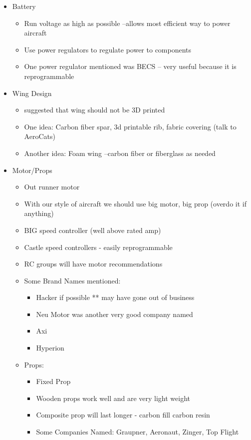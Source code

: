 \documentclass{article}
\begin{document}
\begin{spacing}{1.1}
\begin{itemize}
\item Battery
\begin{itemize}
\item Run voltage as high as possible --allows most efficient way to power aircraft
\item Use power regulators to regulate power to components
\item One power regulator mentioned was BECS -- very useful because it is reprogrammable

\end{itemize}


\item Wing Design

\begin{itemize}
\item suggested that wing should not be 3D printed
\item One idea: Carbon fiber spar, 3d printable rib, fabric covering (talk to AeroCats)
\item Another idea: Foam wing --carbon fiber or fiberglass as needed
\end{itemize}

\item Motor/Props
\begin{itemize}
\item Out runner motor
\item With our style of aircraft we should use big motor, big prop (overdo it if anything)
\item BIG speed controller (well above rated amp)
\item Castle speed controllers - easily reprogrammable
\item RC groups will have motor recommendations
\item Some Brand Names mentioned:
\begin{itemize}
\item Hacker if possible ** may have gone out of business
\item Neu Motor was another very good company  named
\item Axi
\item Hyperion
\end{itemize}
\item Props:
\begin{itemize}
\item Fixed Prop
\item Wooden props work well and are very light weight
\item Composite prop will last longer - carbon fill carbon resin
\item Some Companies Named: Graupner, Aeronaut, Zinger, Top Flight
\end{itemize}
\end{itemize}



\end{itemize}
\end{spacing}
\end{document}
